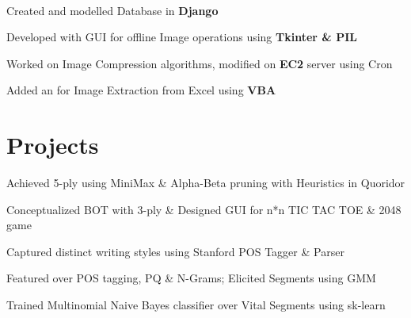 \documentclass[]{Kauts}
\begin{document}
\begin{minipage}[t]{0.69\textwidth}
\\
\begin{tightemize}
\item Created  and modelled Database in \textbf{Django}\\
\item Developed  with GUI for offline Image operations using \textbf{Tkinter \& PIL}\\
\item Worked on Image Compression algorithms, modified on \textbf{EC2} server using Cron\\
\item Added an  for Image Extraction from Excel using \textbf{VBA}
\end{tightemize}


\section{Projects}
\detail{}
\begin{tightemize}
\item Achieved 5-ply using MiniMax \& Alpha-Beta pruning with Heuristics in Quoridor\\
\item Conceptualized BOT with 3-ply \& Designed GUI for n*n TIC TAC TOE \& 2048 game\\
\end{tightemize}
\projectsep

\begin{tightemize}
\item Captured distinct writing styles using Stanford POS Tagger \& Parser
\item Featured over POS tagging, PQ \& N-Grams; Elicited Segments using GMM
\item Trained Multinomial Naive Bayes classifier over Vital Segments using sk-learn
\end{tightemize}
\projectsep


\end{minipage}
\end{document}
